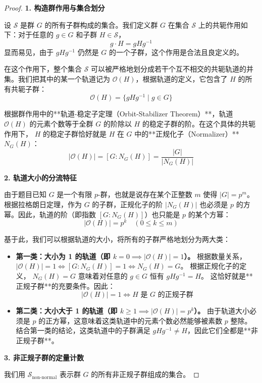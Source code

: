 \documentclass[]{article}
\begin{document}
\begin{proof}
\bigskip
\noindent \textbf{1. 构造群作用与集合划分}

设 $\mathcal{S}$ 是群 $G$ 的所有子群构成的集合。我们定义群 $G$ 在集合 $\mathcal{S}$ 上的共轭作用如下：对于任意的 $g \in G$ 和子群 $H \in \mathcal{S}$，
\[ g \cdot H = gHg^{-1} \]
显而易见，由于 $gHg^{-1}$ 仍然是 $G$ 的一个子群，这个作用是合法且良定义的。

在这个作用下，整个集合 $\mathcal{S}$ 可以被严格地划分成若干个互不相交的共轭轨道的并集。我们把其中的某一个轨道记为 $\mathcal{O}(H)$，根据轨道的定义，它包含了 $H$ 的所有共轭子群：
\[ \mathcal{O}(H) = \{ gHg^{-1} \mid g \in G \} \]

根据群作用中的**轨道-稳定子定理（Orbit-Stabilizer Theorem）**，轨道 $\mathcal{O}(H)$ 的元素个数等于全群 $G$ 的阶除以 $H$ 的稳定子群的阶。在这个具体的共轭作用下， $H$ 的稳定子群恰好就是 $H$ 在 $G$ 中的**正规化子（Normalizer）** $N_G(H)$：
\[ |\mathcal{O}(H)| = [G : N_G(H)] = \frac{|G|}{|N_G(H)|} \]

\bigskip
\noindent \textbf{2. 轨道大小的分流特征}

由于题目已知 $G$ 是一个有限 $p$-群，也就是说存在某个正整数 $m$ 使得 $|G| = p^m$。
根据拉格朗日定理，作为 $G$ 的子群，正规化子的阶 $|N_G(H)|$ 也必须是 $p$ 的方幂。因此，轨道的阶（即指数 $[G : N_G(H)]$）也只能是 $p$ 的某个方幂：
\[ |\mathcal{O}(H)| = p^k \quad (0 \le k \le m) \]

基于此，我们可以根据轨道的大小，将所有的子群严格地划分为两大类：

\begin{itemize}
	\item \textbf{第一类：大小为 1 的轨道（即 $k = 0 \implies |\mathcal{O}(H)| = 1$）。}
	根据数量关系， $| \mathcal{O}(H) | = 1 \iff [G : N_G(H)] = 1 \iff N_G(H) = G$。
	根据正规化子的定义， $N_G(H) = G$ 意味着对任意的 $g \in G$ 恒有 $gHg^{-1} = H$。
	这恰好就是**正规子群**的充要条件。因此：
	\[ |\mathcal{O}(H)| = 1 \iff H \text{ 是 } G \text{ 的正规子群} \]
	
	\item \textbf{第二类：大小大于 1 的轨道（即 $k \ge 1 \implies |\mathcal{O}(H)| = p^k$）。}
	由于轨道大小必须是 $p$ 的正方幂，这意味着这类轨道中的元素个数必然能够被素数 $p$ 整除。
	结合第一类的结论，这类轨道中的子群满足 $gHg^{-1} \neq H$，因此它们全都是**非正规子群**。
\end{itemize}

\bigskip
\noindent \textbf{3. 非正规子群的定量计数}

我们用 $\mathcal{S}_{\text{non-normal}}$ 表示群 $G$ 的所有非正规子群组成的集合。


\end{proof}
\end{document}
